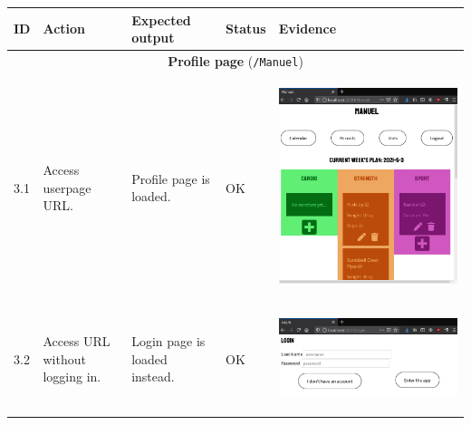 \documentclass[12pt,twoside,titlepage,a4paper]{article}
\theoremstyle{definicion}
\theoremstyle{lema}
\theoremstyle{teorema}
\theoremstyle{corolario}
\theoremstyle{ejemplo}
\theoremstyle{nota}
\begin{document}
\begin{table}[!h]
\begin{tabular}{|m{0.6cm}|m{2.9cm}|m{3.6cm}|m{1.1cm}|m{5.9cm}|}
		\hline
	\end{tabular}
\end{table}
\newpage
\begin{table}[!ht]
	\centering
	\begin{tabular}{|m{0.6cm}|m{2.9cm}|m{3.6cm}|m{1.1cm}|m{5.9cm}|}
		\hline
		\textbf{ID} & \textbf{Action} & \textbf{Expected output} & \textbf{Status} & \textbf{Evidence} \\
		\hline
		\multicolumn{5}{|c|}{\textbf{Profile page} (\texttt{/Manuel})} \\ 
		\hline
		3.1 & Access userpage URL. & Profile page is loaded. & OK &
		\begin{center}\includegraphics[scale=0.24]{login2-userpage1.png}\end{center} \\
		\hline
		3.2 & Access URL without logging in. & Login page is loaded instead. & OK &
		\begin{center}\includegraphics[scale=0.24]{register2-login1.png}\end{center} \\

\end{tabular}
\end{table}
\end{document}
